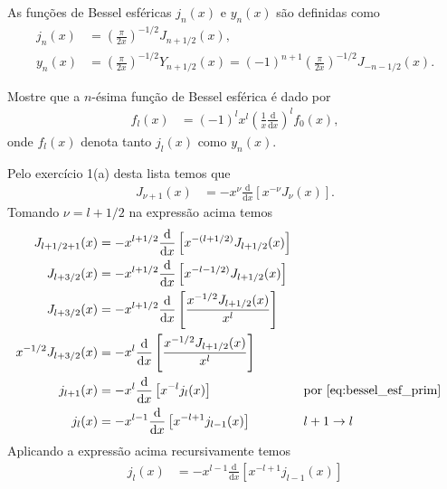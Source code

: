 \documentclass[a4paper,12pt, leqno, answers]{exam}
\begin{document}
\begin{questions}
    As fun\c{c}\~{o}es de Bessel esf\'{e}ricas $j_n(x)$ e $y_n(x)$ s\~{a}o definidas como
    \begin{align}
        j_{n}(x) &= \left( \frac{\pi}{2x} \right)^{-1/2} J_{n + 1/2}(x), \label{eq:bessel_esf_prim} \\
        y_n(x) &= \left( \frac{\pi}{2x} \right)^{-1/2} Y_{n + 1/2}(x) = (-1)^{n + 1} \left( \frac{\pi}{2x} \right)^{-1/2} J_{-n - 1/2}(x). \label{eq:bessel_esf_seg}
    \end{align}

    \question Mostre que a $n$-\'{e}sima fun\c{c}\~{a}o de Bessel esf\'{e}rica \'{e} dado por
    \begin{align*}
        f_l(x) &= (-1)^l x^l \left( \frac{1}{x} \frac{\mathrm{d}}{\mathrm{d}x} \right)^l f_0(x),
    \end{align*}
    onde $f_l(x)$ denota tanto $j_l(x)$ como $y_n(x)$.
    \begin{solution}
        Pelo exerc\'{i}cio 1(a) desta lista temos que
        \begin{align*}
            J_{\nu + 1}(x) &= -x^\nu \frac{\mathrm{d}}{\mathrm{d}x} \left[ x^{-\nu} J_\nu(x) \right].
        \end{align*}
        Tomando $\nu = l + 1/2$ na express\~{a}o acima temos
        \begin{align*}
            J_{l + 1/2 + 1}(x) &= -x^{l + 1/2} \frac{\mathrm{d}}{\mathrm{d}x} \left[ x^{-(l + 1/2)} J_{l + 1/2}(x) \right] \\
            J_{l + 3/2}(x) &= -x^{l + 1/2} \frac{\mathrm{d}}{\mathrm{d}x} \left[ x^{-l - 1/2)} J_{l + 1/2}(x) \right] \\
            J_{l + 3/2}(x) &= - x^{l + 1/2} \frac{\mathrm{d}}{\mathrm{d}x} \left[ \frac{x^{-1/2} J_{l + 1/2}(x)}{x^l} \right] \\
            x^{-1/2} J_{l + 3/2}(x) &= - x^l \frac{\mathrm{d}}{\mathrm{d}x} \left[ \frac{x^{-1/2} J_{l + 1/2}(x)}{x^l} \right] \\
            j_{l + 1}(x) &= - x^l \frac{\mathrm{d}}{\mathrm{d}x} \left[ x^{-l} j_{l}(x) \right] && \text{por \eqref{eq:bessel_esf_prim}} \\
            j_{l}(x) &= - x^{l - 1} \frac{\mathrm{d}}{\mathrm{d}x} \left[ x^{-l + 1} j_{l - 1}(x) \right] && l + 1 \to l 
        \end{align*}
        Aplicando a express\~{a}o acima recursivamente temos
        \begin{align*}
            j_{l}(x) &= - x^{l - 1} \frac{\mathrm{d}}{\mathrm{d}x} \left[ x^{-l + 1} j_{l - 1}(x) \right] \\

\end{align*}
\end{solution}
\end{questions}
\end{document}
